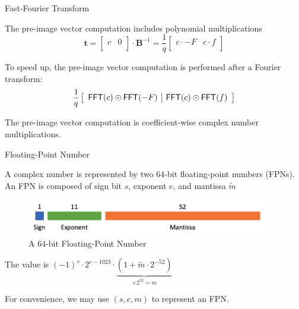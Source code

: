 \begin{frame}{Fast-Fourier Transform}

The pre-image vector computation includes polynomial multiplications
\[
\textbf{t} = \left[ \begin{array}{c|c} c & 0 \\ \end{array} \right] \cdot \mathbf{B}^{-1}
= \frac{1}{q} \left[ \begin{array}{c|c} c \cdot -F & c \cdot f \\ \end{array} \right]
\]
\pause

To speed up, the pre-image vector computation is performed after a Fourier transform:
\[
\frac{1}{q} \left[ \begin{array}{c|c} {\sf FFT}(c) \odot {\sf FFT}(-F) & {\sf FFT}(c) \odot {\sf FFT}(f) \end{array} \right]
\]
\pause

The pre-image vector computation is coefficient-wise complex number multiplications.

\end{frame}


\begin{frame}{Floating-Point Number}

A complex number is represented by two 64-bit floating-point numbers (FPNs). An FPN is composed of sign bit $s$, exponent $e$, and mantissa $\tilde{m}$

\begin{figure}
    \centering
    \includegraphics[width = 300pt]{Figure/fpu.png}
    \caption{A 64-bit Floating-Point Number}
    \label{fig:64bitfpr}
\end{figure}
\pause

The value is $(-1)^s \cdot 2^{e - 1023} \cdot \underbrace{(1 + \tilde{m} \cdot 2^{-52})}_{\times 2^{52} = m}$
\pause

For convenience, we may use $(s, e, m)$ to represent an FPN.

\end{frame}


